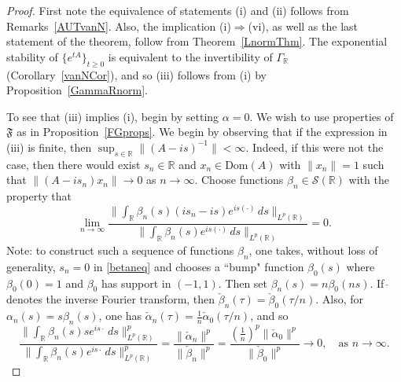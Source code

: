 \documentclass[10pt,psamsfonts,leqno]{siamltex}
\newcommand{\bbR}{\mathbb{R}}
\newcommand{\calS}{\mathcal{S}}
\newcommand{\scrF}{\mathfrak{F}}
\begin{document}
\begin{proof} First note the equivalence of statements
 (i) and (ii) follows from Remarks~\ref{AUTvanN}.
Also,  the implication (i)$\Rightarrow$(vi), as well as the last
statement
of the theorem, follow from  Theorem~\ref{LnormThm}.
The exponential stability of $\{ e^{tA}\}_{t\ge0}$ is equivalent
to the invertibility of $\Gamma_\bbR$ (Corollary~\ref{vanNCor}), and so
(iii) follows from (i) by Proposition~\ref{GammaRnorm}.

To see that (iii) implies (i), begin by setting $\alpha=0$.
We wish to use  properties of $\scrF$ as in
Proposition~\ref{FGprops}.  We begin by observing that if the
expression in
(iii) is finite, then
$\sup_{s\in\bbR}\|(A-is)^{-1}\|<\infty$.  Indeed, if this were not the
case, then there would exist $s_n\in\bbR$ and $x_n\in \text{Dom}(A)$
with
$\|x_n\|=1$ such that $\|(A-is_n)x_n\|\to 0$ as $n\to\infty$.
Choose functions $\beta_n\in\calS(\bbR)$ with the property that
\begin{equation}\label{betaneq}
\lim_{n\to\infty}\frac{\|\int_\bbR
  \beta_n(s)(is_n-is)e^{is(\cdot)}\,ds\|_{L^p(\bbR)}}
  {\|\int_\bbR \beta_n(s)e^{is(\cdot)}\,ds\|_{L^p(\bbR)}}=0.
\end{equation}
Note: to construct such a sequence of functions $\beta_n$,
one takes, without loss of generality, $s_n=0$ in \eqref{betaneq}
and chooses a ``bump" function $\beta_0(s)$ where $\beta_0(0)=1$ and
$\beta_0$ has support in $(-1,1)$.  Then set $\beta_n(s)=n\beta_0(ns)$.
If  $\check{\ }$ denotes the inverse Fourier transform, then
$\check{\beta}_n(\tau)=\check{\beta}_0(\tau/n)$.  Also, for
$\alpha_n(s)=s\beta_n(s)$, one has $\check{\alpha}_n(\tau)
= \frac{1}{n}\check{\alpha}_0(\tau/n)$, and so
$$
\frac{\|\int_\bbR\beta_n(s)se^{is\cdot}\,ds\|^p_{L^p(\bbR)}}
{\|\int_\bbR\beta_n(s)e^{is\cdot}\,ds\|^p_{L^p(\bbR)}}
=\frac{\|\check{\alpha}_n\|^p}{\|\check{\beta}_n\|^p}
=\frac{\left(\frac{1}{n}\right)^p
\|\check{\alpha}_0\|^p}{\|\check{\beta}_0\|^p}
\to 0,\quad\mbox{as }n\to\infty.
$$


\end{proof}
\end{document}
